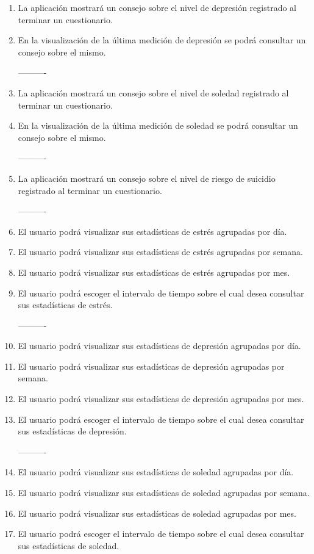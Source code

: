 \begin{enumerate}[label=\textbf{\texttt{RF-\arabic*}}]
            ----------
            \item La aplicación mostrará un consejo sobre el nivel de depresión registrado al terminar un cuestionario.
            \item En la visualización de la última medición de depresión se podrá consultar un consejo sobre el mismo. 
            
            ----------
            \item La aplicación mostrará un consejo sobre el nivel de soledad registrado al terminar un cuestionario.
            \item En la visualización de la última medición de soledad se podrá consultar un consejo sobre el mismo. 
            
            ----------
            \item La aplicación mostrará un consejo sobre el nivel de riesgo de suicidio registrado al terminar un cuestionario.
            
            ----------
            \item El usuario podrá visualizar sus estadísticas de estrés agrupadas por día.
            \item El usuario podrá visualizar sus estadísticas de estrés agrupadas por semana.
            \item El usuario podrá visualizar sus estadísticas de estrés agrupadas por mes.
            \item El usuario podrá escoger el intervalo de tiempo sobre el cual desea consultar sus estadísticas de estrés.
            
            ----------
            \item El usuario podrá visualizar sus estadísticas de depresión agrupadas por día.
            \item El usuario podrá visualizar sus estadísticas de depresión agrupadas por semana.
            \item El usuario podrá visualizar sus estadísticas de depresión agrupadas por mes.
            \item El usuario podrá escoger el intervalo de tiempo sobre el cual desea consultar sus estadísticas de depresión.

            ----------
            \item El usuario podrá visualizar sus estadísticas de soledad agrupadas por día.
            \item El usuario podrá visualizar sus estadísticas de soledad agrupadas por semana.
            \item El usuario podrá visualizar sus estadísticas de soledad agrupadas por mes.
            \item El usuario podrá escoger el intervalo de tiempo sobre el cual desea consultar sus estadísticas de soledad.


\end{enumerate}
